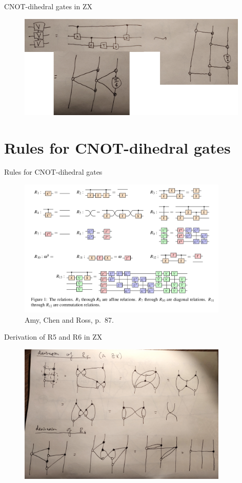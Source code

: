 \documentclass{beamer}
\theoremstyle{definition}
\begin{document}
\begin{frame}{CNOT-dihedral gates in ZX}
\begin{figure}
\includegraphics[width=11cm]{V-in-ZX}
\centering
\end{figure}
\end{frame}

\section{Rules for CNOT-dihedral gates}

\begin{frame}{Rules for CNOT-dihedral gates}

\begin{figure}
\includegraphics[width=10cm]{relations}
\centering
\caption{Amy, Chen and Ross, p.~87.}
\end{figure}
\end{frame}

\begin{frame}{Derivation of R5 and R6 in ZX}

\begin{figure}
\includegraphics[width=10cm]{R5-R6}
\centering
\end{figure}
\end{frame}
\end{document}
